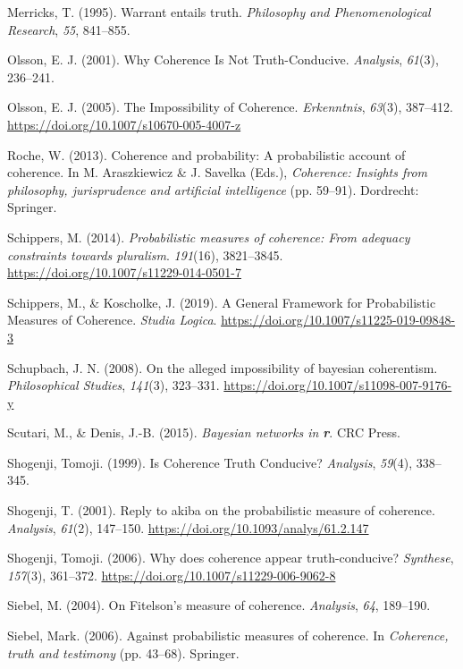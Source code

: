 \documentclass[
  10pt,
]{scrartcl}
\newlength{\cslhangindent}
\newlength{\cslentryspacingunit} %
\newenvironment{CSLReferences}[2] %
 {%
  \setlength{\parindent}{0pt}
  \ifodd #1
  \let\oldpar\par
  \def\par{\hangindent=\cslhangindent\oldpar}
  \fi
  \setlength{\parskip}{#2\cslentryspacingunit}
 }%
 {}
\begin{document}
\begin{CSLReferences}{1}{0}
\leavevmode{}%
Merricks, T. (1995). Warrant entails truth. \emph{Philosophy and Phenomenological Research}, \emph{55}, 841--855.

\leavevmode{}%
Olsson, E. J. (2001). Why {Coherence Is Not Truth}-{Conducive}. \emph{Analysis}, \emph{61}(3), 236--241.

\leavevmode{}%
Olsson, E. J. (2005). The {Impossibility} of {Coherence}. \emph{Erkenntnis}, \emph{63}(3), 387--412. \url{https://doi.org/10.1007/s10670-005-4007-z}

\leavevmode{}%
Roche, W. (2013). Coherence and probability: A probabilistic account of coherence. In M. Araszkiewicz \& J. Savelka (Eds.), \emph{Coherence: Insights from philosophy, jurisprudence and artificial intelligence} (pp. 59--91). Dordrecht: Springer.

\leavevmode{}%
Schippers, M. (2014). \emph{Probabilistic measures of coherence: From adequacy constraints towards pluralism}. \emph{191}(16), 3821--3845. \url{https://doi.org/10.1007/s11229-014-0501-7}

\leavevmode{}%
Schippers, M., \& Koscholke, J. (2019). A {General Framework} for {Probabilistic Measures} of {Coherence}. \emph{Studia Logica}. \url{https://doi.org/10.1007/s11225-019-09848-3}

\leavevmode{}%
Schupbach, J. N. (2008). On the alleged impossibility of bayesian coherentism. \emph{Philosophical Studies}, \emph{141}(3), 323--331. \url{https://doi.org/10.1007/s11098-007-9176-y}

\leavevmode{}%
Scutari, M., \& Denis, J.-B. (2015). \emph{Bayesian networks in \textbf{{r}}}. CRC Press.

\leavevmode{}%
Shogenji, Tomoji. (1999). Is {Coherence Truth Conducive}? \emph{Analysis}, \emph{59}(4), 338--345.

\leavevmode{}%
Shogenji, T. (2001). Reply to akiba on the probabilistic measure of coherence. \emph{Analysis}, \emph{61}(2), 147--150. \url{https://doi.org/10.1093/analys/61.2.147}

\leavevmode{}%
Shogenji, Tomoji. (2006). Why does coherence appear truth-conducive? \emph{Synthese}, \emph{157}(3), 361--372. \url{https://doi.org/10.1007/s11229-006-9062-8}

\leavevmode{}%
Siebel, M. (2004). On {F}itelson's measure of coherence. \emph{Analysis}, \emph{64}, 189--190.

\leavevmode{}%
Siebel, Mark. (2006). Against probabilistic measures of coherence. In \emph{Coherence, truth and testimony} (pp. 43--68). Springer.

\end{CSLReferences}
\end{document}
